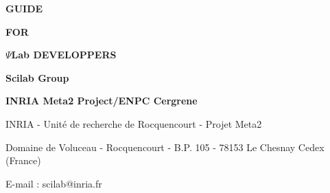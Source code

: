 
\pagestyle{empty}


\hspace*{-2.cm}

\newpage

\vspace{8.cm}

\Huge\bf  {GUIDE}

\Huge\bf  {FOR}

\Huge\bf  {$\Psi$Lab DEVELOPPERS}



\vspace{3.cm}

\Huge\bf {Scilab Group}

\Large\bf
INRIA Meta2 Project/ENPC Cergrene

\normalsize

\vspace{12.cm}

INRIA - Unit\'e de recherche de Rocquencourt - Projet Meta2

Domaine de Voluceau - Rocquencourt - B.P. 105 - 78153 Le Chesnay Cedex (France)

E-mail : scilab@inria.fr

\newpage
\mbox{ }
\newpage

\normalsize
{}
\tableofcontents

\pagestyle{headings}

